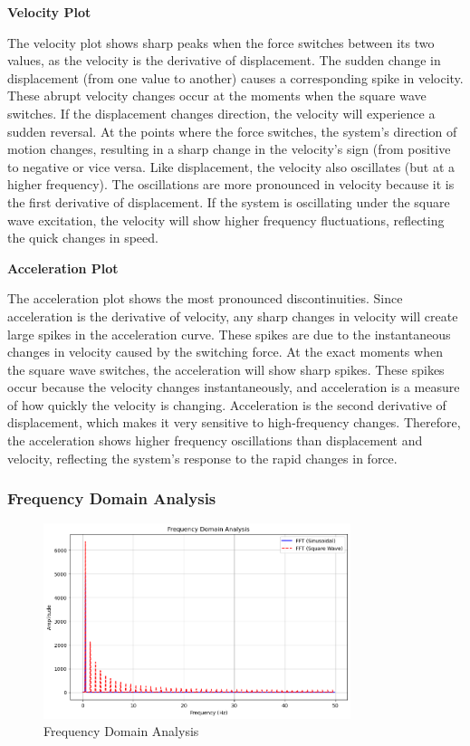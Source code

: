 \documentclass[12pt,a4paper]{article}
\begin{document}
\noindent\textbf{Velocity Plot}  

The velocity plot shows sharp peaks when the force switches between its two values, as the velocity is the derivative of displacement. The sudden change in displacement (from one value to another) causes a corresponding spike in velocity. These abrupt velocity changes occur at the moments when the square wave switches. If the displacement changes direction, the velocity will experience a sudden reversal. At the points where the force switches, the system’s direction of motion changes, resulting in a sharp change in the velocity's sign (from positive to negative or vice versa. Like displacement, the velocity also oscillates (but at a higher frequency). The oscillations are more pronounced in velocity because it is the first derivative of displacement. If the system is oscillating under the square wave excitation, the velocity will show higher frequency fluctuations, reflecting the quick changes in speed.
\vspace{5pt}

\noindent\textbf{Acceleration Plot}

The acceleration plot shows the most pronounced discontinuities. Since acceleration is the derivative of velocity, any sharp changes in velocity will create large spikes in the acceleration curve. These spikes are due to the instantaneous changes in velocity caused by the switching force. At the exact moments when the square wave switches, the acceleration will show sharp spikes. These spikes occur because the velocity changes instantaneously, and acceleration is a measure of how quickly the velocity is changing. Acceleration is the second derivative of displacement, which makes it very sensitive to high-frequency changes. Therefore, the acceleration shows higher frequency oscillations than displacement and velocity, reflecting the system's response to the rapid changes in force.
{\vspace{10pt}}

\subsubsection{Frequency Domain Analysis}
\begin{figure}[H]
    \centering
    \includegraphics[width=0.8\textwidth]{freq_domain.png} 
    \caption{Frequency Domain Analysis}
    \label{fig:system}
\end{figure}
{\vspace{10pt}}
\end{document}
